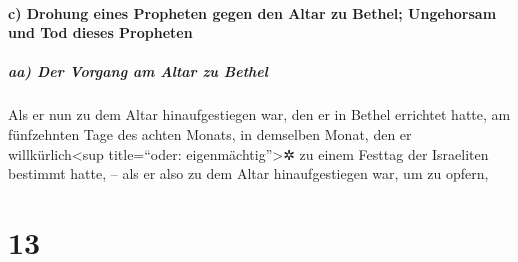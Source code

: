 \hypertarget{c-drohung-eines-propheten-gegen-den-altar-zu-bethel-ungehorsam-und-tod-dieses-propheten}{%
\paragraph{c) Drohung eines Propheten gegen den Altar zu Bethel;
Ungehorsam und Tod dieses
Propheten}\label{c-drohung-eines-propheten-gegen-den-altar-zu-bethel-ungehorsam-und-tod-dieses-propheten}}

\hypertarget{aa-der-vorgang-am-altar-zu-bethel}{%
\subparagraph{aa) Der Vorgang am Altar zu
Bethel}\label{aa-der-vorgang-am-altar-zu-bethel}}

Als er nun zu dem Altar hinaufgestiegen war, den er in
Bethel errichtet hatte, am fünfzehnten Tage des achten Monats, in
demselben Monat, den er willkürlich\textless sup title=``oder:
eigenmächtig''\textgreater✲ zu einem Festtag der Israeliten bestimmt
hatte, -- als er also zu dem Altar hinaufgestiegen war, um zu opfern,

\hypertarget{section-12}{%
\section{13}\label{section-12}}

